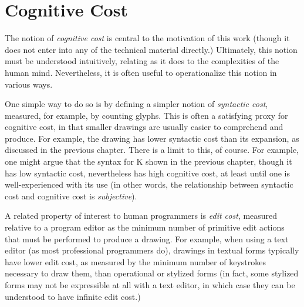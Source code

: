 
\section{Cognitive Cost}\label{sec:syntactic-properties}
The notion of \emph{cognitive cost} is central to the motivation of this work (though it does not enter into any of the technical material directly.) Ultimately, this notion must be understood intuitively, relating as it does to the complexities of the human mind. Nevertheless, it is often useful to operationalize this notion in various ways. 

One simple way to do so is by defining a simpler notion of \emph{syntactic cost}, measured, for example, by counting glyphs. This is often a satisfying proxy for cognitive cost, in that smaller drawings are usually easier to comprehend and produce. For example, the drawing \li{[1, 2, 3, 4, 5]} has lower syntactic cost than its expansion, as discussed in the previous chapter. There is a limit to this, of course. For example, one might argue that the syntax for K shown in the previous chapter, though it has low syntactic cost, nevertheless has high cognitive cost, at least until one is well-experienced with its use (in other words, the relationship between syntactic cost and cognitive cost is \emph{subjective}).

A related property of interest to human programmers is \emph{edit cost}, measured relative to a program editor as the minimum number of primitive edit actions that must be performed to produce a drawing. For example, when using a text editor (as most professional programmers do), drawings in textual forms typically have lower edit cost, as measured by the minimum number of keystrokes necessary to draw them, than operational or stylized forms (in fact, some stylized forms may not be expressible at all with a text editor, in which case they can be understood to have infinite edit cost.) %

